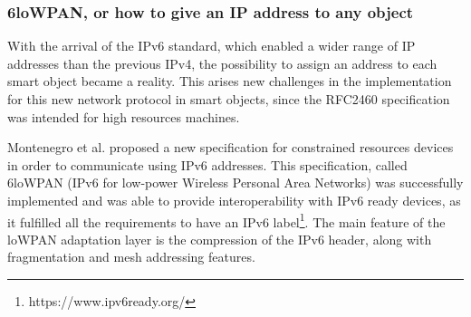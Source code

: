 \subsubsection{6loWPAN, or how to give an IP address to any object}
With the arrival of the IPv6 standard\cite{rfc2460}, which enabled a wider range of IP addresses than the previous IPv4, the possibility to assign an address to each smart object became a reality.
This arises new challenges in the implementation for this new network protocol in smart objects, since the RFC2460\cite{rfc2460} specification was intended for high resources machines.

Montenegro et al. proposed a new specification\cite{rfc4944} for constrained resources devices in order to communicate using IPv6 addresses.
This specification, called 6loWPAN (IPv6 for low-power Wireless Personal Area Networks) was successfully implemented\cite{durvy08making} and was able to provide interoperability with IPv6 ready devices, as it fulfilled all the requirements to have an IPv6 label\footnote{https://www.ipv6ready.org/}.
The main feature of the loWPAN adaptation layer is the compression of the IPv6 header, along with fragmentation and mesh addressing features.





